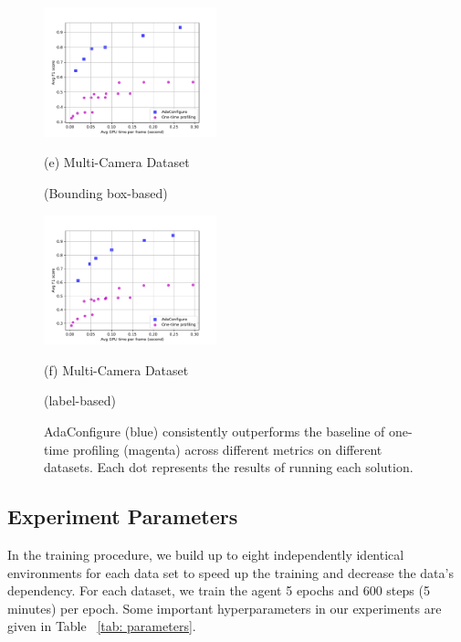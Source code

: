 \begin{figure}[!t]
\begin{minipage}[t]{0.47\linewidth}
	\end{minipage}
	\vfill
	\begin{minipage}[t]{0.47\linewidth}
	\centerline{\includegraphics[width=5cm]{figures/_Westbound_Eastbound_Rear.pdf}}
	\centerline{(e) Multi-Camera Dataset }%
	\centerline{(Bounding box-based)}
	\end{minipage}
	\hfill
	\begin{minipage}[t]{0.47\linewidth}
	\centerline{\includegraphics[width=5cm]{figures/_Westbound_Eastbound_Rear_label.pdf}}
	\centerline{(f) Multi-Camera Dataset }%
	\centerline{(label-based)}
	\end{minipage}		
	\caption{AdaConfigure (blue) consistently outperforms the baseline of one-time profiling (magenta) across different metrics on different datasets. Each dot represents the results of running each solution.}
	\label{fig: results}
\end{figure}

\subsection{Experiment Parameters}
In the training procedure, we build up to eight independently identical environments for each data set to speed up the training and decrease the data's dependency. For each dataset, we train the agent 5 epochs and 600 steps (5 minutes) per epoch. Some important hyperparameters in our experiments are given in Table ~\ref{tab: parameters}.

